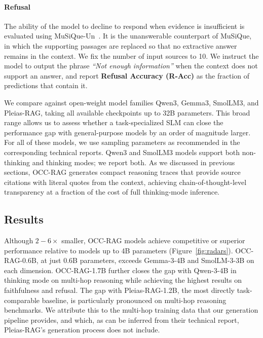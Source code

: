 \documentclass{article}
\begin{document}
\paragraph{Refusal} The ability of the model to decline to respond when evidence is insufficient is evaluated using MuSiQue-Un~\citep{musique}. It is the unanswerable counterpart of MuSiQue, in which the supporting passages are replaced so that no extractive answer remains in the context. We fix the number of input sources to 10. We instruct the model to output the phrase \textit{``Not enough information''} when the context does not support an answer, and report \textbf{Refusal Accuracy (R-Acc)} as the fraction of predictions that contain it.

We compare against open-weight model families Qwen3, Gemma3, SmolLM3, and Pleias-RAG, taking all available checkpoints up to 32B parameters. This broad range allows us to assess whether a task-specialized SLM can close the performance gap with general-purpose models by an order of magnitude larger. For all of these models, we use sampling parameters as recommended in the corresponding technical reports. Qwen3 and SmolLM3 models support both non-thinking and thinking modes; we report both. As we discussed in previous sections, OCC-RAG generates compact reasoning traces that provide source citations with literal quotes from the context, achieving chain-of-thought-level transparency at a fraction of the cost of full thinking-mode inference.

\subsection{Results}

Although $2-6\times$ smaller, OCC-RAG models achieve competitive or superior performance relative to models up to 4B parameters (Figure~\ref{fig:radars}). OCC-RAG-0.6B, at just 0.6B parameters, exceeds Gemma-3-4B and SmolLM-3-3B on each dimension. OCC-RAG-1.7B further closes the gap with Qwen-3-4B in thinking mode on multi-hop reasoning while achieving the highest results on faithfulness and refusal. The gap with Pleias-RAG-1.2B, the most directly task-comparable baseline, is particularly pronounced on multi-hop reasoning benchmarks. We attribute this to the multi-hop training data that our generation pipeline provides, and which, as can be inferred from their technical report, Pleias-RAG's generation process does not include.
\end{document}
